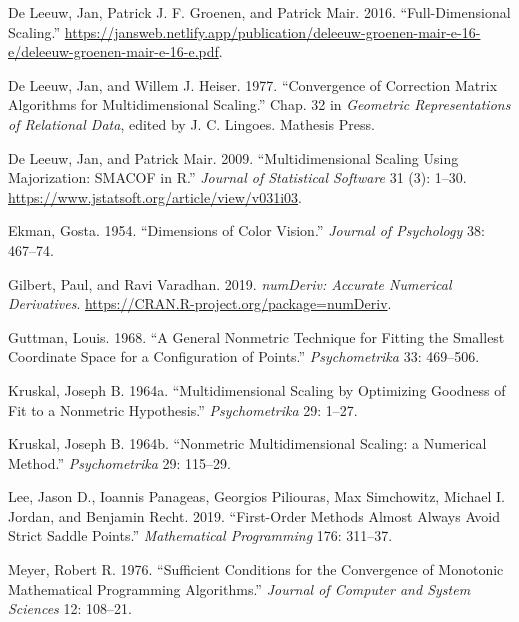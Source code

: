 \documentclass[
  12pt,
  letterpaper,
  DIV=11,
  numbers=noendperiod]{scrartcl}
\newlength{\cslhangindent}
\newenvironment{CSLReferences}[2] %
 {\begin{list}{}{%
  \setlength{\itemindent}{0pt}
  \setlength{\leftmargin}{0pt}
  \setlength{\parsep}{0pt}
  \ifodd #1
   \setlength{\leftmargin}{\cslhangindent}
   \setlength{\itemindent}{-1\cslhangindent}
  \fi
  \setlength{\itemsep}{#2\baselineskip}}}
 {\end{list}}
\begin{document}
\begin{CSLReferences}{1}{1}
De Leeuw, Jan, Patrick J. F. Groenen, and Patrick Mair. 2016.
{``Full-Dimensional Scaling.''}
\url{https://jansweb.netlify.app/publication/deleeuw-groenen-mair-e-16-e/deleeuw-groenen-mair-e-16-e.pdf}.

De Leeuw, Jan, and Willem J. Heiser. 1977. {``Convergence of Correction
Matrix Algorithms for Multidimensional Scaling.''} Chap. 32 in
\emph{Geometric Representations of Relational Data}, edited by J. C.
Lingoes. Mathesis Press.

De Leeuw, Jan, and Patrick Mair. 2009. {``{Multidimensional Scaling
Using Majorization: SMACOF in R}.''} \emph{Journal of Statistical
Software} 31 (3): 1--30.
\url{https://www.jstatsoft.org/article/view/v031i03}.

Ekman, Gosta. 1954. {``{Dimensions of Color Vision}.''} \emph{Journal of
Psychology} 38: 467--74.

Gilbert, Paul, and Ravi Varadhan. 2019. \emph{{numDeriv: Accurate
Numerical Derivatives}}.
\url{https://CRAN.R-project.org/package=numDeriv}.

Guttman, Louis. 1968. {``{A General Nonmetric Technique for Fitting the
Smallest Coordinate Space for a Configuration of Points}.''}
\emph{Psychometrika} 33: 469--506.

Kruskal, Joseph B. 1964a. {``{Multidimensional Scaling by Optimizing
Goodness of Fit to a Nonmetric Hypothesis}.''} \emph{Psychometrika} 29:
1--27.

Kruskal, Joseph B. 1964b. {``{Nonmetric Multidimensional Scaling: a
Numerical Method}.''} \emph{Psychometrika} 29: 115--29.

Lee, Jason D., Ioannis Panageas, Georgios Piliouras, Max Simchowitz,
Michael I. Jordan, and Benjamin Recht. 2019. {``First-Order Methods
Almost Always Avoid Strict Saddle Points.''} \emph{Mathematical
Programming} 176: 311--37.

Meyer, Robert R. 1976. {``{Sufficient Conditions for the Convergence of
Monotonic Mathematical Programming Algorithms}.''} \emph{Journal of
Computer and System Sciences} 12: 108--21.


\end{CSLReferences}
\end{document}
